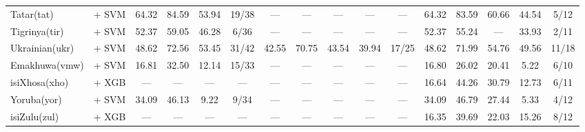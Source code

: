 \begin{table*}[h]
{\begin{tabular}{l|c|cccc|ccccc|ccccc}
            Tatar(tat)             & \citep{wang2024multilingual}    + SVM                                  & 64.32                        & 84.59                        & 53.94                       & 19/38         & —             & —           & —              & —             & —             & 64.32         & 83.59       & 60.66          & 44.54         & 5/12          \\
            Tigrinya(tir)          & \citep{wang2024multilingual}    + SVM                                  & 52.37                        & 59.05                        & 46.28                       & 6/36          & —             & —           & —              & —             & —             & 52.37         & 55.24       & —              & 33.93         & 2/11          \\
            Ukrainian(ukr)         & \citep{sturua2024jinaembeddingsv3multilingualembeddingstask}   + SVM   & 48.62                        & 72.56                        & 53.45                       & 31/42         & 42.55         & 70.75       & 43.54          & 39.94         & 17/25         & 48.62         & 71.99       & 54.76          & 49.56         & 11/18         \\
            Emakhuwa(vmw)          & \citep{sturua2024jinaembeddingsv3multilingualembeddingstask}   + SVM   & 16.81                        & 32.50                        & 12.14                       & 15/33         & —             & —           & —              & —             & —             & 16.80         & 26.02       & 20.41          & 5.22          & 6/10          \\
            isiXhosa(xho)          & \citep{wang2024multilingual}     + XGB                                 & —                            & —                            & —                           & —             & —             & —           & —              & —             & —             & 16.64         & 44.26       & 30.79          & 12.73         & 6/11          \\
            Yoruba(yor)            & \citep{wang2024multilingual}     + SVM                                 & 34.09                        & 46.13                        & 9.22                        & 9/34          & —             & —           & —              & —             & —             & 34.09         & 46.79       & 27.44          & 5.33          & 4/12          \\
            isiZulu(zul)           & \citep{wang2024multilingual}     + XGB                                 & —                            & —                            & —                           & —             & —             & —           & —              & —             & —             & 16.35         & 39.69       & 22.03          & 15.26         & 8/12          \\

\end{tabular}}
\end{table*}
